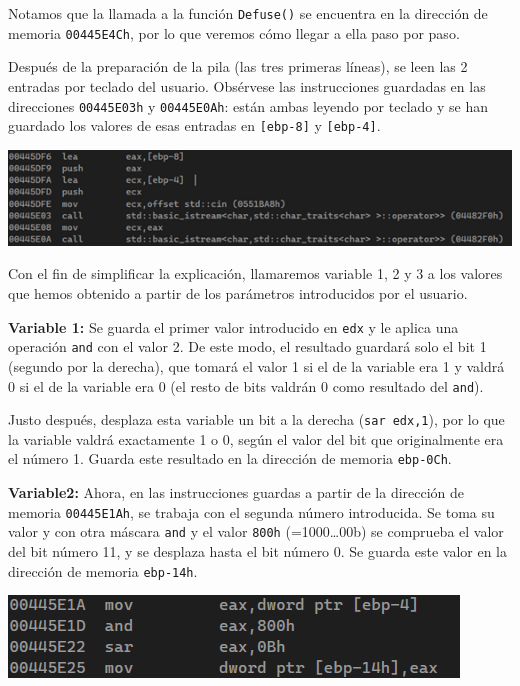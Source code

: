 \documentclass[11pt,a4paper]{article}
\begin{document}
Notamos que la llamada a la función \texttt{Defuse()} se encuentra en la dirección de memoria
\texttt{00445E4Ch}, por lo que veremos cómo llegar a ella paso por paso.

Después de la preparación de la pila (las tres primeras líneas), se leen las 2 entradas por
teclado del usuario. Obsérvese las instrucciones guardadas en las direcciones
\texttt{00445E03h} y \texttt{00445E0Ah}: están ambas leyendo por teclado y se han guardado
los valores de esas entradas en \texttt{[ebp-8]} y \texttt{[ebp-4]}.
\begin{center}
  \includegraphics[width=\textwidth]{Stage3/img2.png}
\end{center}
\noindent Con el fin de simplificar la explicación, llamaremos variable 1, 2 y 3 a los
valores que hemos obtenido a partir de los parámetros introducidos por el usuario.

\vspace{2mm}
\textbf{Variable 1:} Se guarda el primer valor introducido en \texttt{edx} y le aplica una
operación \texttt{and} con el valor 2. De este modo, el resultado guardará solo el bit 1
(segundo por la derecha), que tomará el valor 1 si el de la variable era 1 y valdrá 0 si el
de la variable era 0 (el resto de bits valdrán 0 como resultado del \texttt{and}).

Justo después, desplaza esta variable un bit a la derecha (\texttt{sar edx,1}), por lo que la variable
valdrá exactamente 1 o 0, según el valor del bit que originalmente era el número 1.
Guarda este resultado en la dirección de memoria \texttt{ebp-0Ch}.

\vspace{4mm}
\textbf{Variable2:} Ahora, en las instrucciones guardas a partir de la dirección de memoria
\texttt{00445E1Ah}, se trabaja con el segunda número introducida. Se toma su valor y con otra máscara
\texttt{and} y el valor \texttt{800h} (=1000…00b) se comprueba el valor del bit número 11, y se desplaza
hasta el bit número 0.  Se guarda este valor en la dirección de memoria \texttt{ebp-14h}. 
\begin{center}
  \includegraphics[width=\textwidth]{Stage3/img4.png}
\end{center}
\end{document}
